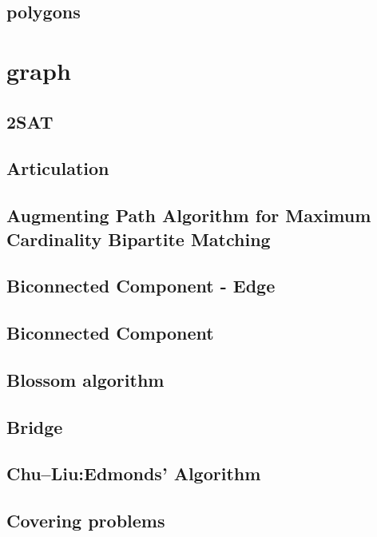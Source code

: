 \documentclass[a4paper,5pt,twocolumn,titlepage]{article}
\begin{document}
\subsection{polygons}


\section{graph}
\subsection{2SAT}

\subsection{Articulation}

\subsection{Augmenting Path Algorithm for Maximum Cardinality Bipartite Matching}

\subsection{Biconnected Component - Edge}

\subsection{Biconnected Component}

\subsection{Blossom algorithm}

\subsection{Bridge}

\subsection{Chu–Liu:Edmonds' Algorithm}

\subsection{Covering problems}

\end{document}
